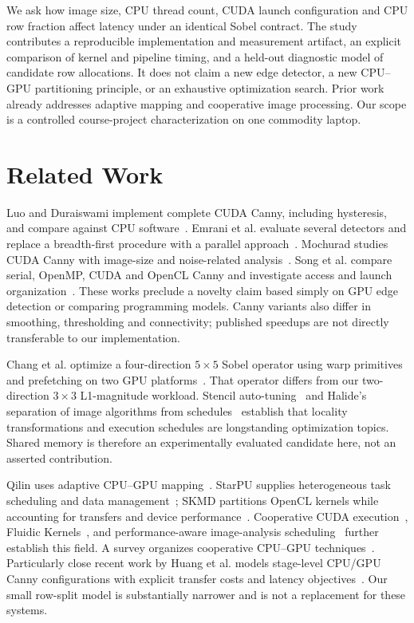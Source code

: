 \documentclass[conference]{IEEEtran}
\begin{document}
We ask how image size, CPU thread count, CUDA launch configuration and CPU row fraction affect latency under an identical Sobel contract. The study contributes a reproducible implementation and measurement artifact, an explicit comparison of kernel and pipeline timing, and a held-out diagnostic model of candidate row allocations. It does not claim a new edge detector, a new CPU--GPU partitioning principle, or an exhaustive optimization search. Prior work already addresses adaptive mapping and cooperative image processing. Our scope is a controlled course-project characterization on one commodity laptop.

\section{Related Work}
Luo and Duraiswami implement complete CUDA Canny, including hysteresis, and compare against CPU software~\cite{luo2008}. Emrani et al. evaluate several detectors and replace a breadth-first procedure with a parallel approach~\cite{emrani2017}. Mochurad studies CUDA Canny with image-size and noise-related analysis~\cite{mochurad2022}. Song et al. compare serial, OpenMP, CUDA and OpenCL Canny and investigate access and launch organization~\cite{song2024}. These works preclude a novelty claim based simply on GPU edge detection or comparing programming models. Canny variants also differ in smoothing, thresholding and connectivity; published speedups are not directly transferable to our implementation.

Chang et al. optimize a four-direction $5\times5$ Sobel operator using warp primitives and prefetching on two GPU platforms~\cite{chang2023}. That operator differs from our two-direction $3\times3$ L1-magnitude workload. Stencil auto-tuning~\cite{datta} and Halide's separation of image algorithms from schedules~\cite{halide} establish that locality transformations and execution schedules are longstanding optimization topics. Shared memory is therefore an experimentally evaluated candidate here, not an asserted contribution.

Qilin uses adaptive CPU--GPU mapping~\cite{qilin}. StarPU supplies heterogeneous task scheduling and data management~\cite{starpu}; SKMD partitions OpenCL kernels while accounting for transfers and device performance~\cite{skmd}. Cooperative CUDA execution~\cite{hybrid2014}, Fluidic Kernels~\cite{fluidic}, and performance-aware image-analysis scheduling~\cite{teodoro} further establish this field. A survey organizes cooperative CPU--GPU techniques~\cite{survey2018}. Particularly close recent work by Huang et al. models stage-level CPU/GPU Canny configurations with explicit transfer costs and latency objectives~\cite{recent2026}. Our small row-split model is substantially narrower and is not a replacement for these systems.
\end{document}
